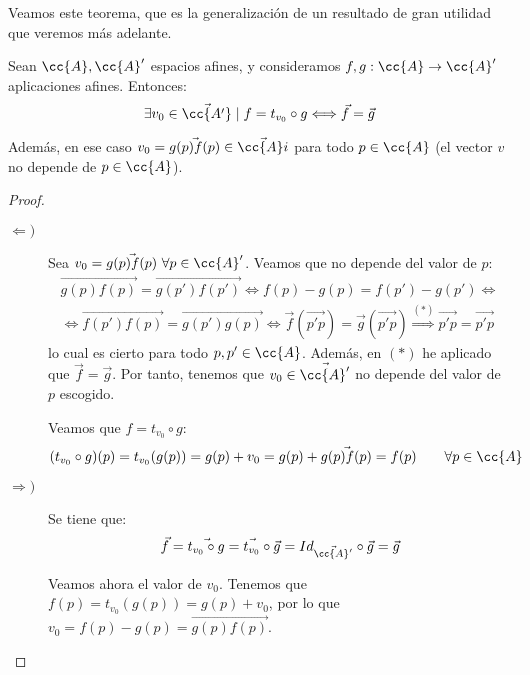 Veamos este teorema, que es la generalización de un resultado de gran utilidad que veremos más adelante.
\begin{teo}
    Sean $\cc{A},\cc{A}'$ espacios afines, y consideramos $f,g:\cc{A}\to \cc{A}'$ aplicaciones afines. Entonces:
    \begin{equation*}
        \exists v_0\in \vec{\cc{A'}}\mid f=t_{v_0}\circ g \Longleftrightarrow \vec{f}=\vec{g}
    \end{equation*}

    Además, en ese caso $v_0=\vec{g(p)f(p)}\in \vec{\cc{A}i}$ para todo $p\in \cc{A}$ (el vector $v$ no depende de $p\in \cc{A}$).
\end{teo}
\begin{proof}\
    \begin{description}
        \item[$\Longleftarrow)$] Sea $v_0=\vec{g(p)f(p)}~\forall p\in \cc{A}'$. Veamos que no depende del valor de $p$:
        \begin{multline*}
            \vec{g(p)f(p)} = \vec{g(p')f(p')} \Longleftrightarrow f(p)-g(p) = f(p')-g(p') \Longleftrightarrow \\ \Longleftrightarrow \vec{f(p')f(p)} = \vec{g(p')g(p)} \Longleftrightarrow \vec{f}(\vec{p'p}) = \vec{g}(\vec{p'p}) \stackrel{(\ast)}{\Longrightarrow} \vec{p'p} = \vec{p'p}
        \end{multline*}
        lo cual es cierto para todo $p,p'\in \cc{A}$. Además, en $(\ast)$ he aplicado que $\vec{f}=\vec{g}$. Por tanto, tenemos que $v_0\in \vec{\cc{A}'}$ no depende del valor de $p$ escogido.

        Veamos que $f=t_{v_0}\circ g$:
        \begin{equation*}
            (t_{v_0}\circ g)(p) = t_{v_0}(g(p)) = g(p) + v_0 = g(p) + \vec{g(p)f(p)} = f(p) \qquad \forall p\in \cc{A}
        \end{equation*}

        \item[$\Longrightarrow)$] Se tiene que:
        \begin{equation*}
            \vec{f} = \vec{t_{v_0}\circ g} = \vec{t_{v_0}}\circ \vec{g} = Id_{\vec{\cc{A}'}}\circ \vec{g} = \vec{g}
        \end{equation*}

        Veamos ahora el valor de $v_0$. Tenemos que $f(p)=t_{v_0}(g(p)) = g(p)+v_0$, por lo que $v_0=f(p)-g(p)=\vec{g(p)f(p)}$.
    \end{description}
\end{proof}

